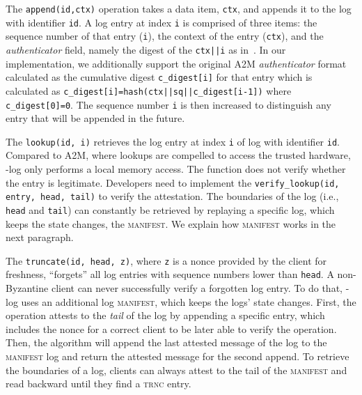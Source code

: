  The \texttt{append(id,ctx)} operation takes a data item, \texttt{ctx}, and appends it to the log with identifier \texttt{id}. A log entry at index \texttt{i} is comprised of three items: the sequence number of that entry (\texttt{i}), the context of the entry (\texttt{ctx}), and the {\em authenticator} field, namely the digest of the \texttt{ctx||i} as in~\cite{levin2009trinc}. In our implementation, we additionally support the original A2M {\em authenticator} format calculated as the cumulative digest \texttt{c\_digest[i]} for that entry which is calculated as \texttt{c\_digest[i]=hash(ctx||sq||c\_digest[i-1])} where \texttt{c\_digest[0]=0}. The sequence number \texttt{i} is then increased to distinguish any entry that will be appended in the future. %





 The \texttt{lookup(id, i)} retrieves the log entry at index \texttt{i} of log with identifier \texttt{id}. Compared to A2M, where lookups are compelled to access the trusted hardware, \projecttitle{}-log only performs a local memory access. 
The function does not verify whether the entry is legitimate. Developers need to implement the \texttt{verify\_lookup(id, entry, head, tail)} to verify the attestation. The boundaries of the log (i.e., \texttt{head} and \texttt{tail}) can constantly be retrieved by replaying a specific log, which keeps the state changes, the \textsc{manifest}. We explain how \textsc{manifest} works in the next paragraph.

 The \texttt{truncate(id, head, z)}, where \texttt{z} is a nonce provided by the client for freshness, ``forgets'' all log entries with sequence numbers lower than \texttt{head}. A non-Byzantine client can never successfully verify a forgotten log entry. To do that, \projecttitle{}-log uses an additional log \textsc{manifest}, which keeps the logs' state changes. First, the operation attests to the {\em tail} of the log by appending a specific entry, which includes the nonce for a correct client to be later able to verify the operation. Then, the algorithm will append the last attested message of the log to the \textsc{manifest} log and return the attested message for the second append. To retrieve the boundaries of a log, clients can always attest to the tail of the \textsc{manifest} and read backward until they find a \textsc{trnc} entry.


